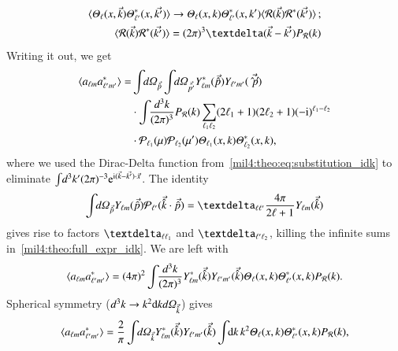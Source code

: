 \begin{equation}\label{mil4:theo:eq:substitution_idk}
\begin{split}
    \langle \Theta_\ell(x,\vec{k}) \Theta_{\ell'}^*(x,\vec{k'})\rangle \to \Theta_\ell(x,k) \Theta_{\ell'}^*(x,k') \langle \mathcal{R}(\vec{k}) \mathcal{R}^*(\vec{k'}) \rangle \,; \\
    \quad \langle \mathcal{R}(\vec{k}) \mathcal{R}^*(\vec{k'}) \rangle = (2\pi)^3 \deltafunc{\vec{k}-\vec{k'}} P_\mathcal{R}(k) 
\end{split}
\end{equation}
Writing it out, we get
\begin{equation}\label{mil4:theo:full_expr_idk}
\begin{split}
    \langle a\ellm a^*\ellmp \rangle =&  \int \dOmg[p] \int \dOmg[p'] Y_{\ell m}^*(\vec{\hat{p}}) Y_{\ell' m'}(\vec{\hat{p}'})  \\
    &\cdot \int \dkkk P_\mathcal{R}(k)  \sum_{\ell_1 \ell_2} (2\ell_1 +1) (2\ell_2 +1) (-\im)^{\ell_1-\ell_2} \\
    &\cdot \mathcal{P}_{\ell_1}(\mu)\mathcal{P}_{\ell_2}(\mu')\Theta_{\ell_1}(x,k) \Theta^{*}_{\ell_2}(x,k) ,
\end{split}
\end{equation} 
where we used the Dirac-Delta function from~\cref{mil4:theo:eq:substitution_idk} to eliminate $\int \! d^3k' (2\pi)^{-3} \eu[\im (\vec{k}-\vec{k'})\cdot \vec{x}]$. The identity 
\begin{equation}
    \int \dOmg[p] Y\ellm (\vec{\hat{p}}) \mathcal{P}_{\ell'}(\vec{\hat{k}}\cdot \vec{\hat{p}}) = \deltasym{\ell \ell'} \frac{4\pi}{2\ell +1}Y\ellm (\vec{\hat{k}})
\end{equation}
gives rise to factors $\deltasym{\ell \ell_1}$ and $\deltasym{\ell' \ell_2}$, killing the infinite sums in~\cref{mil4:theo:full_expr_idk}. We are left with
\begin{equation}
    \langle a\ellm a^*\ellmp \rangle =  (4\pi)^2 \int \dkkk Y_{\ell m}^*(\vec{\hat{k}}) Y_{\ell' m'}(\vec{\hat{k}})  \Theta_{\ell}(x,k) \Theta^{*}_{\ell'}(x,k) P_\mathcal{R}(k).
\end{equation}
Spherical symmetry ($d^3k \to k^2 \, \dx{k} \,\dOmg[k]$) gives 
\begin{equation}
    \langle a\ellm a^*\ellmp \rangle = \frac{2}{\pi} \int \dOmg[k] Y_{\ell m}^\ast(\vec{\hat{k}}) Y_{\ell' m'}(\vec{\hat{k}}) \int \dx{k} k^2  \Theta_{\ell}(x,k) \Theta^{*}_{\ell'}(x,k)  P_\mathcal{R}(k),
\end{equation}
